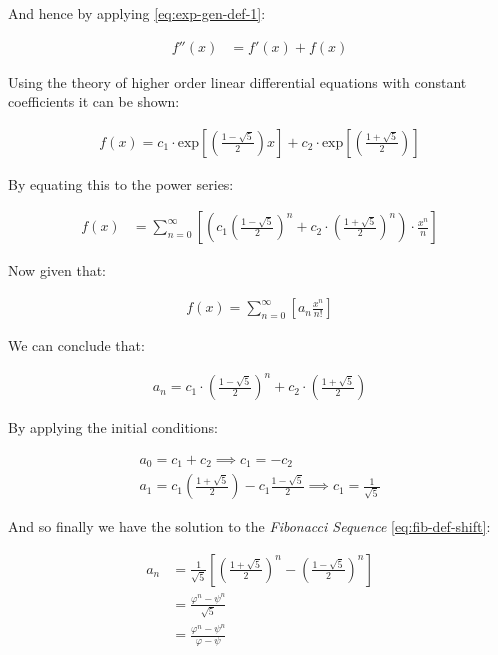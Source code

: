 \documentclass[11pt]{article}
\begin{document}
And hence by applying \eqref{eq:exp-gen-def-1}:

\begin{align}
f''\left( x \right) &= f'\left( x \right)+  f\left( x \right)
\end{align}


Using the theory of higher order linear differential equations with
constant coefficients it can be shown:


\begin{align*}
f\left( x \right)= c_1 \cdot  \mathrm{exp}\left[ \left( \frac{1- \sqrt{5} }{2} \right)x \right] +  c_2 \cdot  \mathrm{exp}\left[ \left( \frac{1 +  \sqrt{5} }{2} \right) \right]
\end{align*}


By equating this to the power series:


\begin{align*}
f\left( x \right)&= \sum^{\infty}_{n= 0}   \left[ \left( c_1\left( \frac{1- \sqrt{5} }{2} \right)^n +  c_2 \cdot  \left( \frac{1+ \sqrt{5} }{2} \right)^n \right) \cdot  \frac{x^n}{n} \right]
\end{align*}


Now given that:


\begin{align*}
f\left( x \right)= \sum^{\infty}_{n= 0}   \left[ a_n \frac{x^n}{n!} \right]
\end{align*}


We can conclude that:


\begin{align*}
a_n = c_1\cdot  \left( \frac{1- \sqrt{5} }{2} \right)^n +  c_2 \cdot  \left( \frac{1+  \sqrt{5} }{2} \right)
\end{align*}


By applying the initial conditions:


\begin{align*}
a_0= c_1 +  c_2  \implies  c_1= - c_2\\
a_1= c_1 \left( \frac{1+ \sqrt{5} }{2} \right) -  c_1 \frac{1-\sqrt{5} }{2}  \implies  c_1 = \frac{1}{\sqrt{5} }
\end{align*}


And so finally we have the solution to the \emph{Fibonacci Sequence} \ref{eq:fib-def-shift}:


\begin{align}
    a_n &= \frac{1}{\sqrt{5} } \left[ \left( \frac{1+  \sqrt{5} }{2}  \right)^n -  \left( \frac{1- \sqrt{5} }{2} \right)^n \right] \nonumber \\
&= \frac{\varphi^n - \psi^n}{\sqrt{5} } \nonumber\\
&=\frac{\varphi^n -  \psi^n}{\varphi - \psi} \label{eq:fib-sol}
\end{align}
\end{document}
